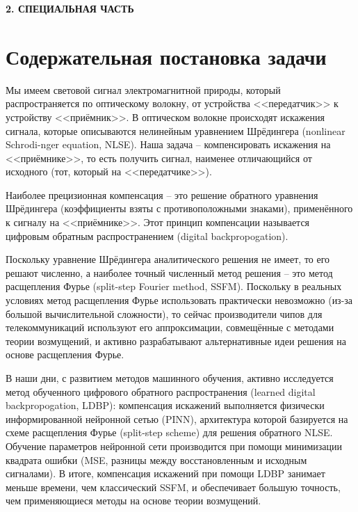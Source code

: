 \newpage
\begin{center}
	\textbf{\large 2. СПЕЦИАЛЬНАЯ ЧАСТЬ}
\end{center}

\section{Содержательная постановка задачи}

Мы имеем световой сигнал электромагнитной природы, который распространяется по оптическому волокну, от устройства <<передатчик>> к устройству <<приёмник>>. В оптическом волокне происходят искажения сигнала, которые описываются нелинейным уравнением Шрёдингера (nonlinear Schrodi-nger equation, NLSE). Наша задача -- компенсировать искажения на <<приёмнике>>, то есть получить сигнал, наименее отличающийся от исходного (тот, который на <<передатчике>>).

Наиболее прецизионная компенсация -- это решение обратного уравнения Шрёдингера (коэффициенты взяты с противоположными знаками), применённого к сигналу на <<приёмнике>>. Этот принцип компенсации называется цифровым обратным распространением (digital backpropogation).

Поскольку уравнение Шрёдингера аналитического решения не имеет, то его решают численно, а наиболее точный численный метод решения -- это метод расщепления Фурье (split-step Fourier method, SSFM). Поскольку в реальных условиях метод расщепления Фурье использовать практически невозможно (из-за большой вычислительной сложности), то сейчас производители чипов для телекоммуникаций используют его аппроксимации, совмещённые с методами теории возмущений, и активно разрабатывают альтернативные идеи решения на основе расщепления Фурье.

В наши дни, с развитием методов машинного обучения, активно исследуется метод обученного цифрового обратного распространения (learned digital backpropogation, LDBP): компенсация искажений выполняется физически информированной нейронной сетью (PINN), архитектура которой базируется на схеме расщепления Фурье (split-step scheme) для решения обратного NLSE. Обучение параметров нейронной сети производится при помощи минимизации квадрата ошибки (MSE, разницы между восстановленным и исходным сигналами). В итоге, компенсация искажений при помощи LDBP занимает меньше времени, чем классический SSFM, и обеспечивает большую точность, чем применяющиеся методы на основе теории возмущений.

